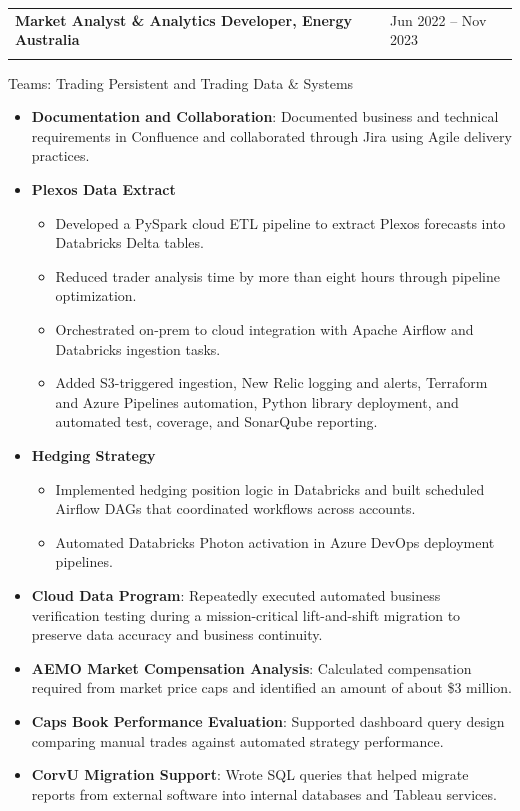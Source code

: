 \documentclass[10pt,a4paper]{article}
\makeatletter
\newenvironment{resumejob}[3]{
  \par\addvspace{0.45em}
  \noindent\begin{tabularx}{\textwidth}{@{}>{\raggedright\arraybackslash}X>{\raggedleft\arraybackslash}p{0.3\textwidth}@{}}
    \textbf{\textcolor{textdark}{#1}} & \textcolor{mutedtext}{#2} \\
    \multicolumn{2}{@{}l@{}}{\textit{\textcolor{mutedtext}{#3}}}
  \end{tabularx}
  \vspace{-0.55em}
}{
  \par\addvspace{0.2em}
}
\makeatother
\begin{document}
\begin{resumejob}{Market Analyst \& Analytics Developer, Energy Australia}{Jun 2022 -- Nov 2023}{Melbourne}
Teams: Trading Persistent and Trading Data \& Systems
\begin{itemize}
  \item \textbf{Documentation and Collaboration}: Documented business and technical requirements in Confluence and collaborated through Jira using Agile delivery practices.
  \item \textbf{Plexos Data Extract}
  \begin{itemize}
    \item Developed a PySpark cloud ETL pipeline to extract Plexos forecasts into Databricks Delta tables.
    \item Reduced trader analysis time by more than eight hours through pipeline optimization.
    \item Orchestrated on-prem to cloud integration with Apache Airflow and Databricks ingestion tasks.
    \item Added S3-triggered ingestion, New Relic logging and alerts, Terraform and Azure Pipelines automation, Python library deployment, and automated test, coverage, and SonarQube reporting.
  \end{itemize}
  \item \textbf{Hedging Strategy}
  \begin{itemize}
    \item Implemented hedging position logic in Databricks and built scheduled Airflow DAGs that coordinated workflows across accounts.
    \item Automated Databricks Photon activation in Azure DevOps deployment pipelines.
  \end{itemize}
  \item \textbf{Cloud Data Program}: Repeatedly executed automated business verification testing during a mission-critical lift-and-shift migration to preserve data accuracy and business continuity.
  \item \textbf{AEMO Market Compensation Analysis}: Calculated compensation required from market price caps and identified an amount of about \$3 million.
  \item \textbf{Caps Book Performance Evaluation}: Supported dashboard query design comparing manual trades against automated strategy performance.
  \item \textbf{CorvU Migration Support}: Wrote SQL queries that helped migrate reports from external software into internal databases and Tableau services.
\end{itemize}
\end{resumejob}
\end{document}
